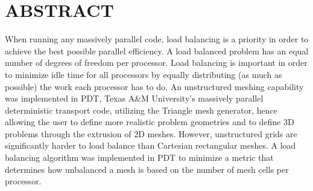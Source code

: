 %
%
%

\chapter*{ABSTRACT}

\pagestyle{plain} %
\setcounter{page}{2}

\indent When running any massively parallel code, load balancing is a priority in order to achieve the best possible parallel efficiency. A load balanced problem has an equal number of degrees of freedom per processor. Load balancing is important in order to minimize idle time for all processors by equally distributing (as much as possible) the work each processor has to do. 
\indent An unstructured meshing capability was implemented in PDT, Texas A\&M University's massively parallel deterministic transport code, utilizing the Triangle mesh generator, hence allowing the user to define more realistic problem geometries and to define 3D problems through the extrusion of 2D meshes. However, unstructured grids are significantly  harder to load balance than Cartesian rectangular meshes. A load balancing algorithm was implemented in PDT to minimize a metric that determines how unbalanced a mesh is based on the number of mesh cells per processor. 

 

\pagebreak{}
